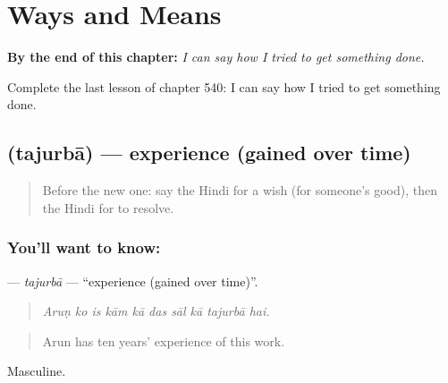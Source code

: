 
\chapter{Ways and Means}
\label{ch:hi-ways-and-means}

\begin{chapteropening}
\textbf{By the end of this chapter:} \emph{I can say how I tried to get something done.}

Complete the last lesson of chapter 540: I can say how I tried to get something done.
\end{chapteropening}

\section[\texorpdfstring{\hi{तजुर्बा} (tajurbā)}{तजुर्बा (tajurbā)}]{ (tajurbā) — experience (gained over time)}

\label{lesson:HI-C540-tajurba}



\begin{quote}
Before the new one: say the Hindi for a wish (for someone's good), then the Hindi for to resolve.
\end{quote}

\subsection*{You'll want to know: }
\textbf{} — \emph{tajurbā} — \textquotedblleft{}experience (gained over time)\textquotedblright{}.

\begin{quote}
         
\end{quote}

\begin{quote}
\emph{Aruṇ ko is kām kā das sāl kā tajurbā hai.}
\end{quote}

\begin{quote}
Arun has ten years' experience of this work.
\end{quote}

Masculine.

